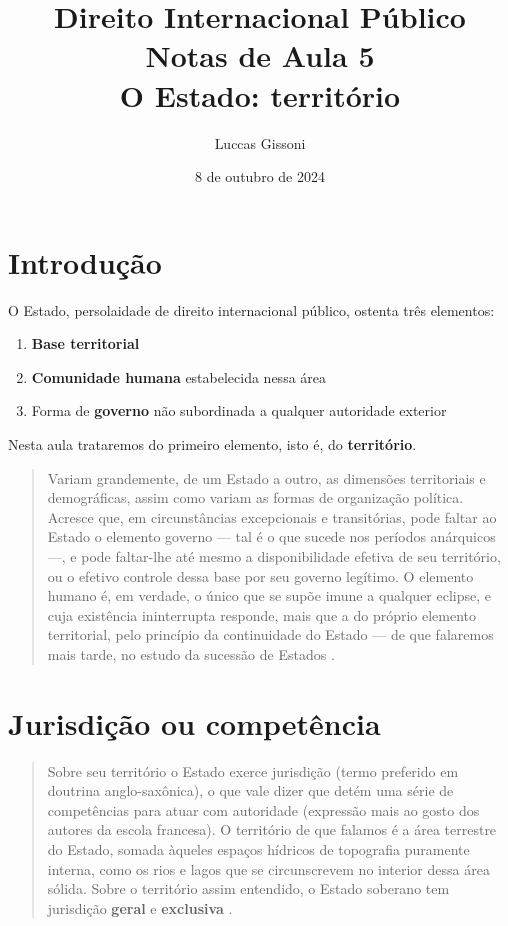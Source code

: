 \documentclass{article}
\title{%
  Direito Internacional Público \\
  \Large Notas de Aula 5\\
  \Large O Estado: território\\
  }
\author{Luccas Gissoni}
\date{8 de outubro de 2024}
\begin{document}
\maketitle
\tableofcontents

\section{Introdução}

O Estado, persolaidade de direito internacional público, ostenta três elementos:

\begin{enumerate}
    \item \textbf{Base territorial}
    \item \textbf{Comunidade humana} estabelecida nessa área
    \item Forma de \textbf{governo} não subordinada a qualquer autoridade exterior
\end{enumerate}

Nesta aula trataremos do primeiro elemento, isto é, do \textbf{território}.

\begin{quote}
    Variam grandemente, de um Estado a outro, as dimensões territoriais e demográficas, assim como variam as formas de organização política. Acresce que, em circunstâncias excepcionais e transitórias, pode faltar ao Estado o elemento governo — tal é o que sucede nos períodos anárquicos —, e pode faltar-lhe até mesmo a disponibilidade efetiva de seu território, ou o efetivo controle dessa base por seu governo legítimo. O elemento humano é, em verdade, o único que se supõe imune a qualquer eclipse, e cuja existência ininterrupta responde, mais que a do próprio elemento territorial, pelo princípio da continuidade do Estado — de que falaremos mais tarde, no estudo da sucessão de Estados \cite[p.~72]{rezek_direito_2024}.
\end{quote}

\section{Jurisdição ou competência}

\begin{quote}
    Sobre seu território o Estado exerce jurisdição (termo preferido em doutrina anglo-saxônica), o que vale dizer que detém uma série de competências para atuar com autoridade (expressão mais ao gosto dos autores da escola francesa). O território de que falamos é a área terrestre do Estado, somada àqueles espaços hídricos de topografia puramente interna, como os rios e lagos que se circunscrevem no inte­rior dessa área sólida. Sobre o território assim entendido, o Estado soberano tem jurisdição \textbf{geral} e \textbf{exclusiva} \cite[p.~72]{rezek_direito_2024}.
\end{quote}
\end{document}
